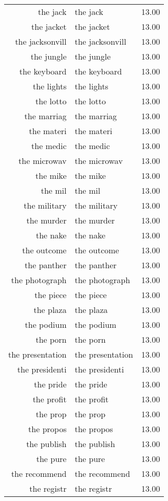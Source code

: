 \begin{table}[ht]
\begin{tabular}{rlr}
  the jack & the jack & 13.00 \\ 
  the jacket & the jacket & 13.00 \\ 
  the jacksonvill & the jacksonvill & 13.00 \\ 
  the jungle & the jungle & 13.00 \\ 
  the keyboard & the keyboard & 13.00 \\ 
  the lights & the lights & 13.00 \\ 
  the lotto & the lotto & 13.00 \\ 
  the marriag & the marriag & 13.00 \\ 
  the materi & the materi & 13.00 \\ 
  the medic & the medic & 13.00 \\ 
  the microwav & the microwav & 13.00 \\ 
  the mike & the mike & 13.00 \\ 
  the mil & the mil & 13.00 \\ 
  the military & the military & 13.00 \\ 
  the murder & the murder & 13.00 \\ 
  the nake & the nake & 13.00 \\ 
  the outcome & the outcome & 13.00 \\ 
  the panther & the panther & 13.00 \\ 
  the photograph & the photograph & 13.00 \\ 
  the piece & the piece & 13.00 \\ 
  the plaza & the plaza & 13.00 \\ 
  the podium & the podium & 13.00 \\ 
  the porn & the porn & 13.00 \\ 
  the presentation & the presentation & 13.00 \\ 
  the presidenti & the presidenti & 13.00 \\ 
  the pride & the pride & 13.00 \\ 
  the profit & the profit & 13.00 \\ 
  the prop & the prop & 13.00 \\ 
  the propos & the propos & 13.00 \\ 
  the publish & the publish & 13.00 \\ 
  the pure & the pure & 13.00 \\ 
  the recommend & the recommend & 13.00 \\ 
  the registr & the registr & 13.00 \\ 

\end{tabular}
\end{table}
